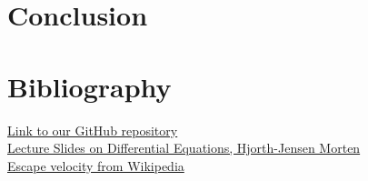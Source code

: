 \documentclass{article}
\begin{document}
\section{Conclusion}


\newpage
\section{Bibliography}


\href{https://github.com/emmernme/MENA-Compfys/tree/master/Project5}{Link to our GitHub repository}\\

\noindent \href{http://compphysics.github.io/ComputationalPhysics/doc/pub/ode/pdf/ode-print.pdf}{Lecture Slides on Differential Equations, Hjorth-Jensen Morten}\\

\noindent \href{https://en.wikipedia.org/wiki/Escape_velocity}{Escape velocity from Wikipedia}\\
\end{document}
